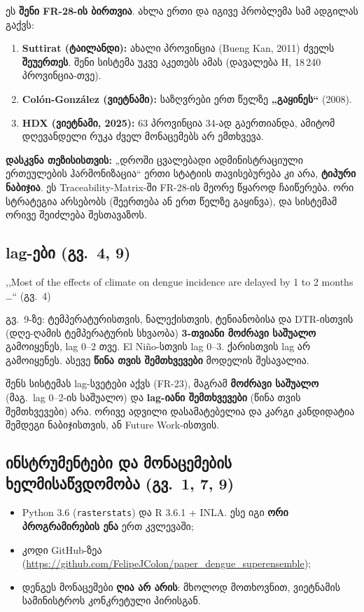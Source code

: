 \documentclass[11pt,a4paper]{article}
\newcommand{\q}[1]{,,#1``}
\begin{document}
\begin{mnishvn}
ეს \textbf{შენი FR-28-ის ბირთვია}. ახლა ერთი და იგივე პრობლემა სამ ადგილას გაქვს:
\begin{enumerate}[nosep]
  \item \textbf{Suttirat (ტაილანდი):} ახალი პროვინცია (Bueng Kan, 2011) ძველს \textbf{შეუერთეს}. შენი სისტემა უკვე
        აკეთებს ამას (დავალება H, 18\,240 პროვინცია-თვე).
  \item \textbf{Colón-González (ვიეტნამი):} საზღვრები ერთ წელზე \textbf{„გაყინეს“} (2008).
  \item \textbf{HDX (ვიეტნამი, 2025):} 63 პროვინცია 34-ად გაერთიანდა, ამიტომ დღევანდელი რუკა ძველ მონაცემებს
        არ ემთხვევა.
\end{enumerate}
\textbf{დასკვნა თეზისისთვის:} „დროში ცვალებადი ადმინისტრაციული ერთეულების ჰარმონიზაცია“ ერთი სტატიის
თავისებურება კი არა, \textbf{ტიპური ნაბიჯია}. ეს Traceability-Matrix-ში FR-28-ის მეორე წყაროდ ჩაიწერება.
ორი სტრატეგია არსებობს (შეერთება ან ერთ წელზე გაყინვა), და სისტემამ ორივე შეიძლება შესთავაზოს.
\end{mnishvn}

\subsection{lag-ები (გვ.\ 4, 9)}
\begin{citata}
\q{Most of the effects of climate on dengue incidence are delayed by 1 to 2 months \ldots} (გვ.\ 4)
\end{citata}
\noindent გვ.\ 9-ზე: ტემპერატურისთვის, ნალექისთვის, ტენიანობისა და DTR-ისთვის (დღე-ღამის ტემპერატურის სხვაობა)
\textbf{3-თვიანი მოძრავი საშუალო} გამოიყენეს, lag 0--2 თვე. El Niño-სთვის lag 0--3. ქარისთვის lag არ გამოიყენეს.
ასევე \textbf{წინა თვის შემთხვევები} მოდელის შესავალია.

\begin{mnishvn}
შენს სისტემას lag-სვეტები აქვს (FR-23), მაგრამ \textbf{მოძრავი საშუალო} (მაგ.\ lag 0--2-ის საშუალო) და
\textbf{lag-იანი შემთხვევები} (წინა თვის შემთხვევები) არა. ორივე ადვილი დასამატებელია და კარგი კანდიდატია
შემდეგი ნაბიჯისთვის, ან Future Work-ისთვის.
\end{mnishvn}

\subsection{ინსტრუმენტები და მონაცემების ხელმისაწვდომობა (გვ.\ 1, 7, 9)}
\begin{itemize}[nosep]
  \item Python 3.6 (\texttt{rasterstats}) და R 3.6.1 + INLA. ესე იგი \textbf{ორი პროგრამირების ენა} ერთ კვლევაში;
  \item კოდი GitHub-ზეა (\url{https://github.com/FelipeJColon/paper_dengue_superensemble});
  \item დენგეს მონაცემები \textbf{ღია არ არის}: მხოლოდ მოთხოვნით, ვიეტნამის სამინისტროს კონკრეტული პირისგან.
\end{itemize}
\end{document}
